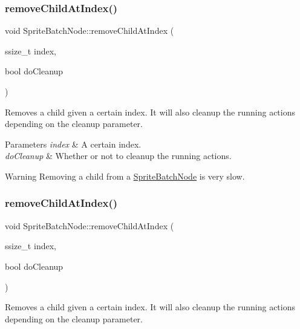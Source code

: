 \subsubsection{\texorpdfstring{remove\+Child\+At\+Index()}{removeChildAtIndex()}\hspace{0.1cm}{\footnotesize\ttfamily [1/2]}}
{\footnotesize\ttfamily void Sprite\+Batch\+Node\+::remove\+Child\+At\+Index (\begin{DoxyParamCaption}\item[{ssize\+\_\+t}]{index,  }\item[{bool}]{do\+Cleanup }\end{DoxyParamCaption})}

Removes a child given a certain index. It will also cleanup the running actions depending on the cleanup parameter.


\begin{DoxyParams}{Parameters}
{\em index} & A certain index. \\
\hline
{\em do\+Cleanup} & Whether or not to cleanup the running actions. \\
\hline
\end{DoxyParams}
\begin{DoxyWarning}{Warning}
Removing a child from a \hyperlink{classSpriteBatchNode}{Sprite\+Batch\+Node} is very slow. 
\end{DoxyWarning}
\mbox{\label{classSpriteBatchNode_a3da2c77141f4f02134d2a8f2308879ff}} 
\subsubsection{\texorpdfstring{remove\+Child\+At\+Index()}{removeChildAtIndex()}\hspace{0.1cm}{\footnotesize\ttfamily [2/2]}}
{\footnotesize\ttfamily void Sprite\+Batch\+Node\+::remove\+Child\+At\+Index (\begin{DoxyParamCaption}\item[{ssize\+\_\+t}]{index,  }\item[{bool}]{do\+Cleanup }\end{DoxyParamCaption})}

Removes a child given a certain index. It will also cleanup the running actions depending on the cleanup parameter.


